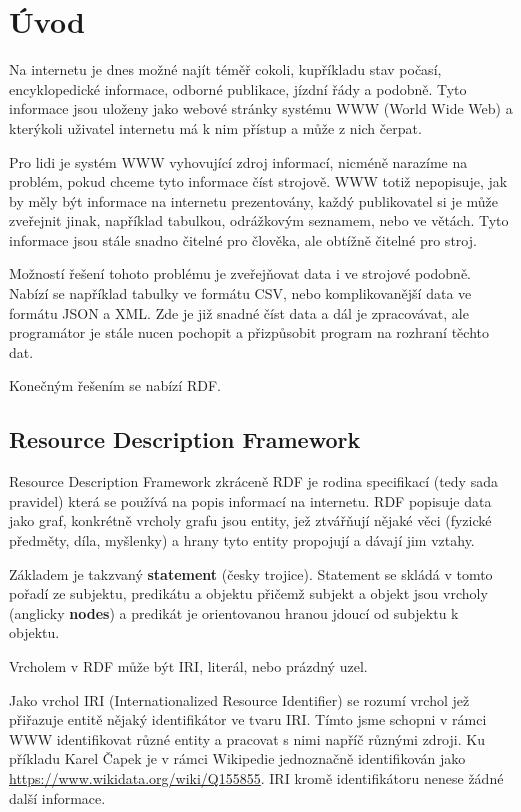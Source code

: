 \chapter*{Úvod}

Na internetu je dnes možné najít téměř cokoli, kupříkladu stav počasí, encyklopedické informace, odborné publikace, jízdní řády a podobně. Tyto informace jsou uloženy jako webové stránky systému WWW (World Wide Web) a kterýkoli uživatel internetu má k nim přístup a může z nich čerpat.

Pro lidi je systém WWW vyhovující zdroj informací, nicméně narazíme na problém, pokud chceme tyto informace číst strojově. WWW totiž nepopisuje, jak by měly být informace na internetu prezentovány, každý publikovatel si je může zveřejnit jinak, například tabulkou, odrážkovým seznamem, nebo ve větách. Tyto informace jsou stále snadno čitelné pro člověka, ale obtížně čitelné pro stroj.

Možností řešení tohoto problému je zveřejňovat data i ve strojové podobně. Nabízí se například tabulky ve formátu CSV, nebo komplikovanější data ve formátu JSON a XML. Zde je již snadné číst data a dál je zpracovávat, ale programátor je stále nucen pochopit a přizpůsobit program na rozhraní těchto dat.

Konečným řešením se nabízí RDF.

\section{Resource Description Framework}
Resource Description Framework zkráceně RDF je rodina specifikací (tedy sada pravidel) která se používá na popis informací na internetu. RDF popisuje data jako graf, konkrétně vrcholy grafu jsou entity, jež ztvářňují nějaké věci (fyzické předměty, díla, myšlenky) a hrany tyto entity propojují a dávají jim vztahy.

Základem je takzvaný \textbf{statement} (česky trojice). Statement se skládá v tomto pořadí ze subjektu, predikátu a objektu přičemž subjekt a objekt jsou vrcholy (anglicky \textbf{nodes}) a predikát je orientovanou hranou jdoucí od subjektu k objektu.

Vrcholem v RDF může být IRI, literál, nebo prázdný uzel.

Jako vrchol IRI (Internationalized Resource Identifier) se rozumí vrchol jež přiřazuje entitě nějaký identifikátor ve tvaru IRI. Tímto jsme schopni v rámci WWW identifikovat různé entity a pracovat s nimi napříč různými zdroji. Ku příkladu Karel Čapek je v rámci Wikipedie jednoznačně identifikován jako \url{https://www.wikidata.org/wiki/Q155855}. IRI kromě identifikátoru nenese žádné další informace.

